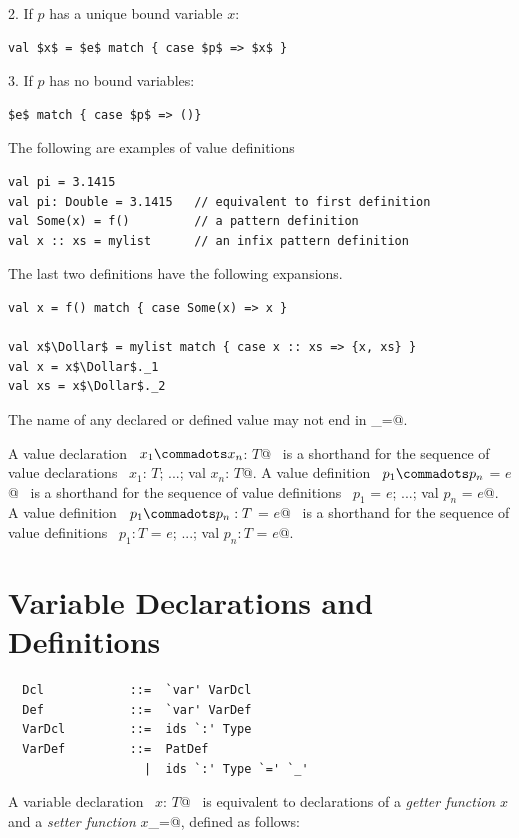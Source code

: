 2. If $p$ has a unique bound variable $x$:
\begin{lstlisting}
val $x$ = $e$ match { case $p$ => $x$ }
\end{lstlisting}

3. If $p$ has no bound variables:
\begin{lstlisting}
$e$ match { case $p$ => ()}
\end{lstlisting}

\example
The following are examples of value definitions
\begin{lstlisting}
val pi = 3.1415 
val pi: Double = 3.1415   // equivalent to first definition
val Some(x) = f()         // a pattern definition
val x :: xs = mylist      // an infix pattern definition
\end{lstlisting}

The last two definitions have the following expansions.
\begin{lstlisting}
val x = f() match { case Some(x) => x }

val x$\Dollar$ = mylist match { case x :: xs => {x, xs} }
val x = x$\Dollar$._1 
val xs = x$\Dollar$._2 
\end{lstlisting}

The name of any declared or defined value may not end in \lstinline@_=@.

A value declaration ~\lstinline@val $x_1 \commadots x_n$: $T$@~
is a
shorthand for the sequence of value declarations
~\lstinline@val $x_1$: $T$; ...; val $x_n$: $T$@.
A value definition ~\lstinline@val $p_1 \commadots p_n$ = $e$@~
is a
shorthand for the sequence of value definitions
~\lstinline@val $p_1$ = $e$; ...; val $p_n$ = $e$@.
A value definition ~\lstinline@val $p_1 \commadots p_n: T$ = $e$@~
is a
shorthand for the sequence of value definitions
~\lstinline@val $p_1: T$ = $e$; ...; val $p_n: T$ = $e$@.

\section{Variable Declarations and Definitions}
\label{sec:vardef}

\syntax\begin{lstlisting}
  Dcl            ::=  `var' VarDcl
  Def            ::=  `var' VarDef
  VarDcl         ::=  ids `:' Type
  VarDef         ::=  PatDef
                   |  ids `:' Type `=' `_'
\end{lstlisting}

A variable declaration ~\lstinline@var $x$: $T$@~ is equivalent to declarations
of a {\em getter function} $x$ and a {\em setter function}
\lstinline@$x$_=@, defined as follows:

